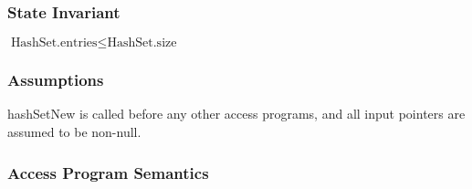 \documentclass[12pt]{article}
\begin{document}
\subsubsection{State Invariant} \label{SecSIAssoc}
	$\text{HashSet.entries} \le \text{HashSet.size}$

\subsubsection{Assumptions} \label{SecAAssoc}
	hashSetNew is called before any other access programs, and all input pointers are assumed to be non-null.

\subsubsection{Access Program Semantics} \label{SecAPSAssoc}
\end{document}
